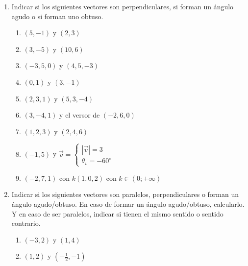 \documentclass[a4paper]{article}
\newcommand{\exercise}{\item}
\newcommand{\SEL}[1]{ \left\{\begin{matrix} #1 \end{matrix}\right. }
\newcommand{\df}[2]{\displaystyle\frac{#1}{#2}}
\newcommand{\vect}[1]{\overrightarrow{#1}}
\newcommand{\degs}{^{\circ}}
\begin{document}
\begin{enumerate}
\begin{enumerate} [label=(\alph*)]
		\item Tiene la misma dirección que $\vec{L}=\SEL{ \rho_L = 5 \\ \theta_L = 30\degs\\ L_z = 2 }$ pero módulo 1
		\item Es unitario y paralelo a $\vect{PQ}$ con $P(1,7,5)$ y $Q(0,0,2)$
		\item Es el vector unitario de $\vec{v}=(5,3)$
		\item Es el versor asociado a $\vec{u}=(1,0,4)$
		\item Es el vector unitario asociado a $\vec{v}=(m,0,-m)$ con $m\in\mathbb{R}$
		\item Tiene la misma dirección que $\vec{r}=\SEL{ |\vec{r}| = 3 \\ \theta_r = 0\degs\\ \phi_r = 45\degs }$ pero módulo 1
	\end{enumerate}
	\exercise Indicar si los siguientes vectores son perpendiculares, si forman un ángulo agudo o si forman uno obtuso. 
	\begin{multicols}{2}
	\begin{enumerate} [label=(\alph*)]
		\item $(5,-1)$ y $(2,3)$
		\item $(3,-5)$ y $(10,6)$
		\item $(-3,5,0)$ y $(4,5,-3)$
		\item $(0,1)$ y $(3,-1)$ 
		\item $(2,3,1)$ y $(5,3,-4)$
		\item $(3,-4,1)$ y el versor de $(-2,6,0)$
		\item $(1,2,3)$ y $(2,4,6)$
		\item $(-1,5)$ y $\vec{v}=\SEL{|\vec{v}| = 3 \\ \theta_v = -60\degs }$ 
		\item $(-2,7,1)$ con $k(1,0,2)$ con $k\in(0;+\infty)$
	\end{enumerate}
	\end{multicols}
	\exercise Indicar si los siguientes vectores son paralelos, perpendiculares o forman un ángulo agudo/obtuso. En caso de formar un ángulo agudo/obtuso, calcularlo. Y en caso de ser paralelos, indicar si tienen el mismo sentido o sentido contrario.
	\begin{multicols}{2}
	\begin{enumerate} [label=(\alph*)]
		\item $(-3,2)$ y $(1,4)$
		\item $(1,2)$ y $\left(-\df{1}{2},-1\right)$

\end{enumerate}
\end{multicols}
\end{enumerate}
\end{document}
